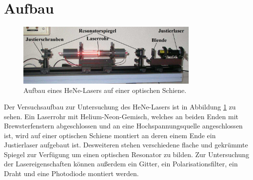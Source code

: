 \section{Aufbau}
\label{sec:Aufbau}

\begin{figure}
\centering
\includegraphics[width=0.8\textwidth]{content/images/aufbau.png}
\caption{Aufbau eines HeNe-Lasers auf einer optischen Schiene.\cite{V64}}
\label{fig:aufbau}
\end{figure}

\noindent Der Versuchsaufbau zur Untersuchung des HeNe-Lasers ist in Abbildung \ref{fig:aufbau} zu sehen.
Ein Laserrohr mit Helium-Neon-Gemisch, welches an beiden Enden mit Brewsterfenstern abgeschlossen und an eine Hochspannungsquelle angeschlossen ist, wird auf einer optischen Schiene montiert an deren einem Ende ein Justierlaser aufgebaut ist.
Desweiteren stehen verschiedene flache und gekrümmte Spiegel zur Verfügung um einen optischen Resonator zu bilden. Zur Untersuchung der Lasereigenschaften können außerdem ein Gitter, ein Polarisationsfilter, ein Draht und eine Photodiode montiert werden. 